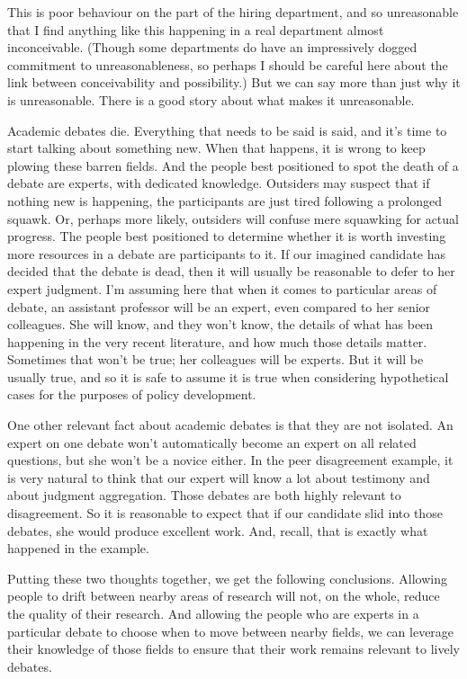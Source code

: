 \documentclass[
  11pt,
  letterpaper,
  DIV=11,
  numbers=noendperiod,
  twoside]{scrartcl}
\begin{document}
This is poor behaviour on the part of the hiring department, and so
unreasonable that I find anything like this happening in a real
department almost inconceivable. (Though some departments do have an
impressively dogged commitment to unreasonableness, so perhaps I should
be careful here about the link between conceivability and possibility.)
But we can say more than just why it is unreasonable. There is a good
story about what makes it unreasonable.

Academic debates die. Everything that needs to be said is said, and it's
time to start talking about something new. When that happens, it is
wrong to keep plowing these barren fields. And the people best
positioned to spot the death of a debate are experts, with dedicated
knowledge. Outsiders may suspect that if nothing new is happening, the
participants are just tired following a prolonged squawk. Or, perhaps
more likely, outsiders will confuse mere squawking for actual progress.
The people best positioned to determine whether it is worth investing
more resources in a debate are participants to it. If our imagined
candidate has decided that the debate is dead, then it will usually be
reasonable to defer to her expert judgment. I'm assuming here that when
it comes to particular areas of debate, an assistant professor will be
an expert, even compared to her senior colleagues. She will know, and
they won't know, the details of what has been happening in the very
recent literature, and how much those details matter. Sometimes that
won't be true; her colleagues will be experts. But it will be usually
true, and so it is safe to assume it is true when considering
hypothetical cases for the purposes of policy development.

One other relevant fact about academic debates is that they are not
isolated. An expert on one debate won't automatically become an expert
on all related questions, but she won't be a novice either. In the peer
disagreement example, it is very natural to think that our expert will
know a lot about testimony and about judgment aggregation. Those debates
are both highly relevant to disagreement. So it is reasonable to expect
that if our candidate slid into those debates, she would produce
excellent work. And, recall, that is exactly what happened in the
example.

Putting these two thoughts together, we get the following conclusions.
Allowing people to drift between nearby areas of research will not, on
the whole, reduce the quality of their research. And allowing the people
who are experts in a particular debate to choose when to move between
nearby fields, we can leverage their knowledge of those fields to ensure
that their work remains relevant to lively debates.
\end{document}
